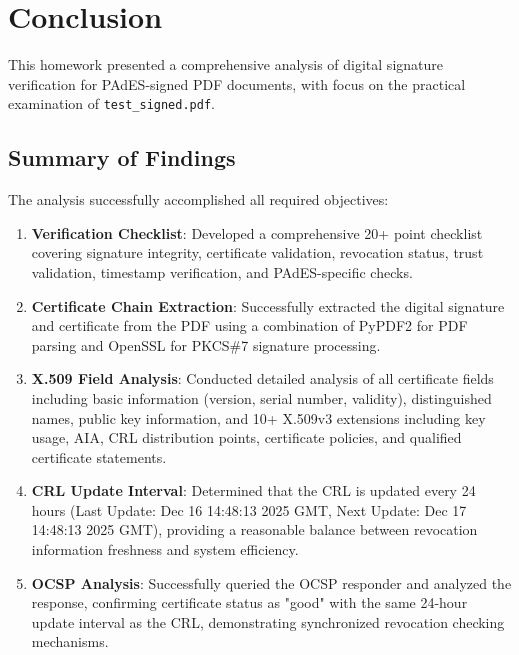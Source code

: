 \documentclass[12pt,a4paper]{article}
\begin{document}
\section{Conclusion}

This homework presented a comprehensive analysis of digital signature verification for PAdES-signed PDF documents, with focus on the practical examination of \texttt{test\_signed.pdf}.

\subsection{Summary of Findings}

The analysis successfully accomplished all required objectives:

\begin{enumerate}
    \item \textbf{Verification Checklist}: Developed a comprehensive 20+ point checklist covering signature integrity, certificate validation, revocation status, trust validation, timestamp verification, and PAdES-specific checks.
    
    \item \textbf{Certificate Chain Extraction}: Successfully extracted the digital signature and certificate from the PDF using a combination of PyPDF2 for PDF parsing and OpenSSL for PKCS\#7 signature processing.
    
    \item \textbf{X.509 Field Analysis}: Conducted detailed analysis of all certificate fields including basic information (version, serial number, validity), distinguished names, public key information, and 10+ X.509v3 extensions including key usage, AIA, CRL distribution points, certificate policies, and qualified certificate statements.
    
    \item \textbf{CRL Update Interval}: Determined that the CRL is updated every 24 hours (Last Update: Dec 16 14:48:13 2025 GMT, Next Update: Dec 17 14:48:13 2025 GMT), providing a reasonable balance between revocation information freshness and system efficiency.
    
    \item \textbf{OCSP Analysis}: Successfully queried the OCSP responder and analyzed the response, confirming certificate status as "good" with the same 24-hour update interval as the CRL, demonstrating synchronized revocation checking mechanisms.
\end{enumerate}
\end{document}
